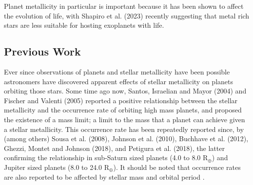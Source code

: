 \documentclass[a4paper,twocolumn,12pt]{article}
\begin{document}



Planet metallicity in particular is important because it has been shown to affect the evolution of life, with Shapiro et al. (2023) \cite{Shapiro} recently suggesting that metal rich stars are less suitable for hosting exoplanets with life.

\subsection{Previous Work}
\label{subsection: Previous Work}
Ever since observations of planets and stellar metallicity have been possible astronomers have discovered apparent effects of stellar metallicity on planets orbiting those stars. Some time ago now, Santos, Israelian and Mayor (2004)\cite{Israelian&Mayor} and Fischer and Valenti (2005)\cite{Fischer&Valenti} reported a positive relationship between the stellar metallicity and the occurrence rate of orbiting high mass planets, and proposed the existence of a mass limit; a limit to the mass that a planet can achieve given a stellar metallicity. This occurrence rate has been repeatedly reported since, by (among others) Sousa et al. (2008)\cite{Sousa.et.al.2008}, Johnson et al. (2010)\cite{Johnson.et.al}, Buchhave et al. (2012)\cite{Buchhave.et.al.2012}, Ghezzi, Montet and Johnson (2018)\cite{Ghezzi.et.al.}, and Petigura et al. (2018)\cite{Petigura.et.al.}, the latter confirming the relationship in sub-Saturn sized planets (4.0 to 8.0 R$_\oplus$) and Jupiter sized planets (8.0 to 24.0 R$_\oplus$). It should be noted that occurrence rates are also reported to be affected by stellar mass and orbital period \cite{Petigura.et.al.}.
\end{document}
